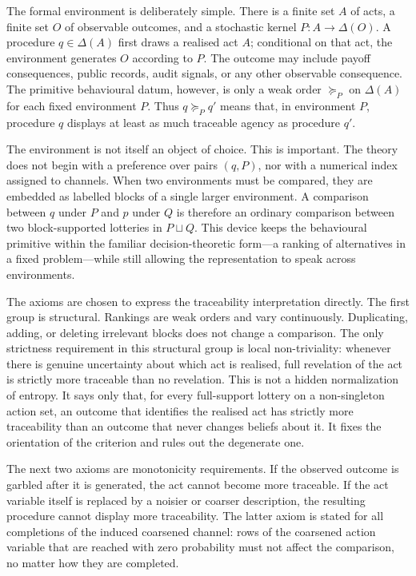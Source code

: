 \documentclass[11pt,a4paper]{article}
\theoremstyle{definition}
\newcommand{\1}{\mathbf 1}
\begin{document}
The formal environment is deliberately simple.  There is a finite set $A$ of acts, a finite set $O$ of observable
outcomes, and a stochastic kernel $P:A\to\Delta(O)$.  A procedure $q\in\Delta(A)$ first draws a realised act $A$;
conditional on that act, the environment generates $O$ according to $P$.  The outcome may include payoff consequences,
public records, audit signals, or any other observable consequence.  The primitive behavioural datum, however, is only a
weak order $\succeq_P$ on $\Delta(A)$ for each fixed environment $P$.  Thus $q\succeq_P q'$ means that, in environment
$P$, procedure $q$ displays at least as much traceable agency as procedure $q'$.

The environment is not itself an object of choice.  This is important.  The theory does not begin with a preference over
pairs $(q,P)$, nor with a numerical index assigned to channels.  When two environments must be compared, they are embedded
as labelled blocks of a single larger environment.  A comparison between $q$ under $P$ and $p$ under $Q$ is therefore an
ordinary comparison between two block-supported lotteries in $P\sqcup Q$.  This device keeps the behavioural primitive
within the familiar decision-theoretic form---a ranking of alternatives in a fixed problem---while still allowing the
representation to speak across environments.

The axioms are chosen to express the traceability interpretation directly.  The first group is structural.  Rankings are
weak orders and vary continuously.  Duplicating, adding, or deleting irrelevant blocks does not change a comparison.  The
only strictness requirement in this structural group is local non-triviality: whenever there is genuine uncertainty about
which act is realised, full revelation of the act is strictly more traceable than no revelation.  This is not a hidden
normalization of entropy.  It says only that, for every full-support lottery on a non-singleton action set, an outcome
that identifies the realised act has strictly more traceability than an outcome that never changes beliefs about it.  It
fixes the orientation of the criterion and rules out the degenerate one.

The next two axioms are monotonicity requirements.  If the observed outcome is garbled after it is generated, the act
cannot become more traceable.  If the act variable itself is replaced by a noisier or coarser description, the resulting
procedure cannot display more traceability.  The latter axiom is stated for all completions of the induced coarsened
channel: rows of the coarsened action variable that are reached with zero probability must not affect the comparison, no
matter how they are completed.
\end{document}
